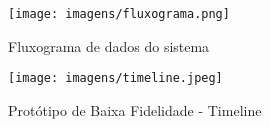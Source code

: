 \begin{sidewaysfigure}[htb]
    \centering
	\texttt{[image: imagens/fluxograma.png]}
	\caption{\label{fig_diag_virado}Fluxograma de dados do sistema}
\end{sidewaysfigure}

\begin{figure}[htb]
    \centering
	\texttt{[image: imagens/timeline.jpeg]}
	\caption{\label{fig_timeline}Protótipo de Baixa Fidelidade - Timeline}
\end{figure}